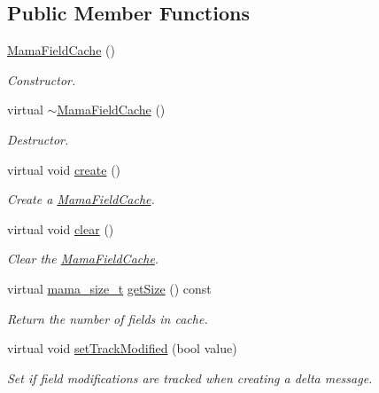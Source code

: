 \subsection*{Public Member Functions}
\begin{DoxyCompactItemize}
\item 
\hyperlink{classWombat_1_1MamaFieldCache_ac81de194fa915df5443340b4a4471666}{MamaFieldCache} ()
\begin{DoxyCompactList}\small\item\em Constructor. \item\end{DoxyCompactList}\item 
virtual \hyperlink{classWombat_1_1MamaFieldCache_a1e7f8a8d3ecc47d8b06583cddb1556a4}{$\sim$MamaFieldCache} ()
\begin{DoxyCompactList}\small\item\em Destructor. \item\end{DoxyCompactList}\item 
virtual void \hyperlink{classWombat_1_1MamaFieldCache_a21392a6167a7598bcf49b5518bcfb206}{create} ()
\begin{DoxyCompactList}\small\item\em Create a \hyperlink{classWombat_1_1MamaFieldCache}{MamaFieldCache}. \item\end{DoxyCompactList}\item 
virtual void \hyperlink{classWombat_1_1MamaFieldCache_a8c4771143c10b12495095ae3ec6321c3}{clear} ()
\begin{DoxyCompactList}\small\item\em Clear the {\ttfamily \hyperlink{classWombat_1_1MamaFieldCache}{MamaFieldCache}}. \item\end{DoxyCompactList}\item 
virtual \hyperlink{classmama__size__t}{mama\_\-size\_\-t} \hyperlink{classWombat_1_1MamaFieldCache_a292e92e9f81abe5a09faffe0ea9a0c4b}{getSize} () const 
\begin{DoxyCompactList}\small\item\em Return the number of fields in cache. \item\end{DoxyCompactList}\item 
virtual void \hyperlink{classWombat_1_1MamaFieldCache_aca21dc3b1435ede84dabad0cfca4aee3}{setTrackModified} (bool value)
\begin{DoxyCompactList}\small\item\em Set if field modifications are tracked when creating a delta message. \item\end{DoxyCompactList}\item 

\end{DoxyCompactItemize}
